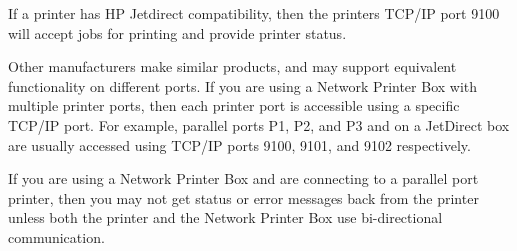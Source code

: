 \documentclass[a4paper]{article}
\begin{document}
If a printer has HP Jetdirect compatibility,
then the printers TCP/IP port 9100 will accept jobs
for printing and provide printer status.

Other manufacturers make similar products,
and may support equivalent functionality on different ports.
If you are using a Network Printer Box with multiple printer ports,
then each printer port is accessible using a specific TCP/IP port.
For example,
parallel ports P1, P2, and P3 and on a JetDirect box are usually accessed
using TCP/IP ports 9100, 9101, and 9102 respectively.

If you are using a Network Printer Box and are connecting to a
parallel port printer,
then you may not get status or error messages back from the printer
unless both the printer and the Network Printer Box use bi-directional
communication.
\end{document}
